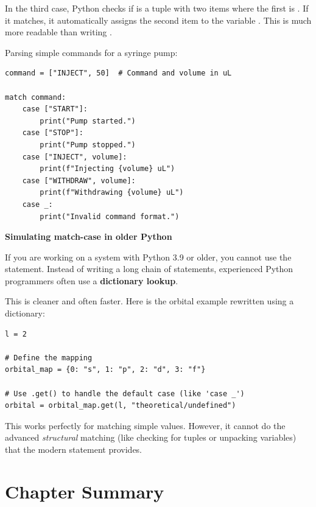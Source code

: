In the third case, Python checks if  is a tuple with two items where the first is . If it matches, it automatically assigns the second item to the variable . This is much more readable than writing .

\begin{labexample}
Parsing simple commands for a syringe pump:

\begin{lstlisting}
command = ["INJECT", 50]  # Command and volume in uL

match command:
    case ["START"]:
        print("Pump started.")
    case ["STOP"]:
        print("Pump stopped.")
    case ["INJECT", volume]:
        print(f"Injecting {volume} uL")
    case ["WITHDRAW", volume]:
        print(f"Withdrawing {volume} uL")
    case _:
        print("Invalid command format.")
\end{lstlisting}
\end{labexample}

\begin{tip}
\textbf{Simulating match-case in older Python}

If you are working on a system with Python 3.9 or older, you cannot use the  statement. Instead of writing a long chain of  statements, experienced Python programmers often use a \textbf{dictionary lookup}.

This is cleaner and often faster. Here is the orbital example rewritten using a dictionary:

\begin{lstlisting}
l = 2

# Define the mapping
orbital_map = {0: "s", 1: "p", 2: "d", 3: "f"}

# Use .get() to handle the default case (like 'case _')
orbital = orbital_map.get(l, "theoretical/undefined")
\end{lstlisting}

This works perfectly for matching simple values. However, it cannot do the advanced \emph{structural} matching (like checking for tuples or unpacking variables) that the modern  statement provides.
\end{tip}

\section{Chapter Summary}
\label{sec:control-summary}

